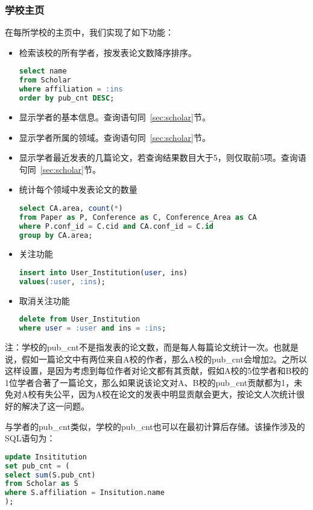 \subsubsection{学校主页}
\label{sec:institution}
在每所学校的主页中，我们实现了如下功能：
\begin{itemize}
\item 检索该校的所有学者，按发表论文数降序排序。
\begin{lstlisting}[language=SQL]
select name
from Scholar
where affiliation = :ins
order by pub_cnt DESC;
\end{lstlisting}
\item 显示学者的基本信息。查询语句同~\ref{sec:scholar}节。
\item 显示学者所属的领域。查询语句同~\ref{sec:scholar}节。
\item 显示学者最近发表的几篇论文，若查询结果数目大于5，则仅取前5项。查询语句同~\ref{sec:scholar}节。
\item 统计每个领域中发表论文的数量
\begin{lstlisting}[language=SQL]
select CA.area, count(*)
from Paper as P, Conference as C, Conference_Area as CA
where P.conf_id = C.cid and CA.conf_id = C.id
group by CA.area;
\end{lstlisting}
\item 关注功能
\begin{lstlisting}[language=SQL]
insert into User_Institution(user, ins)
values(:user, :ins);
\end{lstlisting}
\item 取消关注功能
\begin{lstlisting}[language=SQL]
delete from User_Institution
where user = :user and ins = :ins;
\end{lstlisting}
\end{itemize}
注：学校的pub\_cnt不是指发表的论文数，而是每人每篇论文统计一次。也就是说，假如一篇论文中有两位来自A校的作者，那么A校的pub\_cnt会增加2。之所以这样设置，是因为考虑到每位作者对论文都有其贡献，假如A校的5位学者和B校的1位学者合著了一篇论文，那么如果说该论文对A、B校的pub\_cnt贡献都为1，未免对A校有失公平，因为A校在论文的发表中明显贡献会更大，按论文人次统计很好的解决了这一问题。

与学者的pub\_cnt类似，学校的pub\_cnt也可以在最初计算后存储。该操作涉及的SQL语句为：
\begin{lstlisting}[language=SQL]
update Insititution
set pub_cnt = (
select sum(S.pub_cnt)
from Scholar as S
where S.affiliation = Insitution.name
);
\end{lstlisting}

